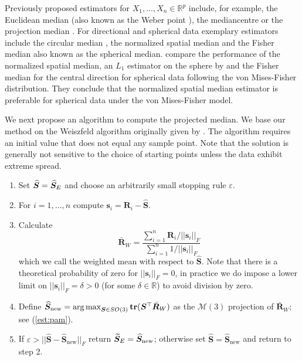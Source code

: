\noindent Previously proposed estimators for $X_1, \ldots, X_n \in \mathbb{R}^p$  include, for example, the Euclidean median (also known as the Weber point \citep{bajaj88}), the mediancentre \citep{gower74} or the projection median \citep{durocher09}. %
For directional and spherical data exemplary estimators include the circular median \citep{mardia72}, the normalized spatial median \citep{ducharme87} and the Fisher median \citep{fisher85} also known as the spherical median. \citet{chan93} compare the performance of the normalized spatial median,  an $L_1$ estimator on the sphere by \cite{he92} and the Fisher median for the central direction for spherical data following the von Mises-Fisher distribution. They conclude that the normalized spatial median estimator is preferable for spherical data under the von Mises-Fisher model. 

\noindent We next propose an algorithm to compute the projected median.  We base our method on the Weiszfeld algorithm originally given by \cite{weiszfeld37}.  The algorithm requires an initial value that does not equal any sample point.   Note that the solution is generally not sensitive to the choice of starting points unless the data exhibit extreme spread.
\begin{enumerate}
\item Set $\widehat{\bm S}={\widehat{\bm S}_E}$ and choose an arbitrarily small stopping rule $\varepsilon$.
\item For $i=1,\ldots,n$ compute $\bm s_i=\bm R_i-\widehat{\bm S}$.
\item Calculate
\[
\bar{\bm R}_W=\frac{\sum_{i=1}^n\bm R_i/||\bm s_i||_F}{\sum_{i=1}^n1/||\bm s_i||_F}
\]
which we call the weighted mean with respect to $\widehat{\bm S}$. Note that  there is a theoretical probability of zero for $||\bm s_i||_F = 0$, in practice we do impose a lower limit on $||\bm s_i||_F = \delta > 0$ (for some $\delta \in \mathbb R$) to avoid division by zero. 
\item Define $\widehat{\bm S}_{\text{new}} = \operatorname*{arg\,max}_{\bm{S}\in
SO(3)}{\mathbf{tr}}(\bm{S}^{\top}\bar{\bm{R}}_W)$ as the $\mathcal{M}(3)$ projection of $\bar{\bm R}_W$; see (\ref{est:pam}).
\item If $\varepsilon>||\widehat{\bm S}-\widehat{\bm S}_{\text{new}}||_F$ return ${\widetilde{\bm S}_E}=\widehat{\bm S}_{\text{new}}$; otherwise set $\widehat{\bm S}=\widehat{\bm S}_{\text{new}}$ and return to step 2.
\end{enumerate}

